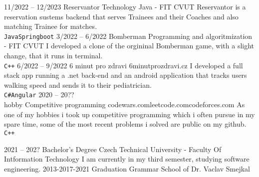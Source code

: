 \documentclass[9pt]{developercv} %
\begin{document}



\begin{entrylist}
	\entry
		{11/2022 -- 12/2023}
		{Reservantor}
		{Technology Java - FIT CVUT}
		{Reservantor is a reservation sustems backend that serves Trainees and their Coaches and also matching Trainee for matches.\\ \texttt{Java}\slashsep\texttt{Springboot}}
	\entry
		{3/2022 -- 6/2022}
		{Bomberman}
		{Programming and algoritmization - FIT CVUT}
		{I developed a clone of the orgininal Bomberman game, with a slight change, that it runs in terminal.\\ \texttt{C++}}
	\entry
		{6/2022 -- 9/2022}
		{6 minut pro zdravi}
		{6minutprozdravi.cz}
		{I developed a full stack app running a .net back-end and an android application that tracks users walking speed and sends it to their pediatrician.\\ \texttt{C\#}\slashsep\texttt{Angular}}
	\entry
		{2020 -- 20??\\\footnotesize{hobby}}
		{Competitive programming}
		{codewars.com\slashsep leetcode.com\slashsep codeforces.com}
		{As one of my hobbies i took up competitive programming which i often pursue in my spare time, some of the most recent problems i solved are public on my github. \\ \texttt{C++}}
\end{entrylist}



\begin{entrylist}
	\entry
		{2021 -- 202?}
		{Bachelor's Degree}
		{Czech Technical University - Faculty Of Intformation Technology}
		{I am currently in my third semester, studying software engineering.}
	\entry
		{2013-2017-2021}
		{Graduation}
		{Grammar School of Dr. Vaclav Smejkal}
		{}
\end{entrylist}
\end{document}
